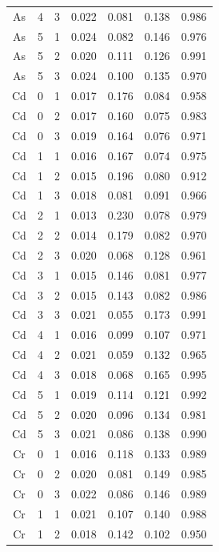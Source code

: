 \documentclass[ms, hidelinks]{uncgdissertationexp3}
\theoremstyle{plain}
\theoremstyle{definition}
\theoremstyle{remark}
\begin{document}
\begin{longtable}{ccccccc}
  \rowcolor{gray!6}  As & 4 & 3 & 0.022 & 0.081 & 0.138 & 0.986\\
  As & 5 & 1 & 0.024 & 0.082 & 0.146 & 0.976\\
  \rowcolor{gray!6}  As & 5 & 2 & 0.020 & 0.111 & 0.126 & 0.991\\
  As & 5 & 3 & 0.024 & 0.100 & 0.135 & 0.970\\
  \rowcolor{gray!6}  Cd & 0 & 1 & 0.017 & 0.176 & 0.084 & 0.958\\
  Cd & 0 & 2 & 0.017 & 0.160 & 0.075 & 0.983\\
  \rowcolor{gray!6}  Cd & 0 & 3 & 0.019 & 0.164 & 0.076 & 0.971\\
  Cd & 1 & 1 & 0.016 & 0.167 & 0.074 & 0.975\\
  \rowcolor{gray!6}  Cd & 1 & 2 & 0.015 & 0.196 & 0.080 & 0.912\\
  Cd & 1 & 3 & 0.018 & 0.081 & 0.091 & 0.966\\
  \rowcolor{gray!6}  Cd & 2 & 1 & 0.013 & 0.230 & 0.078 & 0.979\\
  Cd & 2 & 2 & 0.014 & 0.179 & 0.082 & 0.970\\
  \rowcolor{gray!6}  Cd & 2 & 3 & 0.020 & 0.068 & 0.128 & 0.961\\
  Cd & 3 & 1 & 0.015 & 0.146 & 0.081 & 0.977\\
  \rowcolor{gray!6}  Cd & 3 & 2 & 0.015 & 0.143 & 0.082 & 0.986\\
  Cd & 3 & 3 & 0.021 & 0.055 & 0.173 & 0.991\\
  \rowcolor{gray!6}  Cd & 4 & 1 & 0.016 & 0.099 & 0.107 & 0.971\\
  Cd & 4 & 2 & 0.021 & 0.059 & 0.132 & 0.965\\
  \rowcolor{gray!6}  Cd & 4 & 3 & 0.018 & 0.068 & 0.165 & 0.995\\
  Cd & 5 & 1 & 0.019 & 0.114 & 0.121 & 0.992\\
  \rowcolor{gray!6}  Cd & 5 & 2 & 0.020 & 0.096 & 0.134 & 0.981\\
  Cd & 5 & 3 & 0.021 & 0.086 & 0.138 & 0.990\\
  \rowcolor{gray!6}  Cr & 0 & 1 & 0.016 & 0.118 & 0.133 & 0.989\\
  Cr & 0 & 2 & 0.020 & 0.081 & 0.149 & 0.985\\
  \rowcolor{gray!6}  Cr & 0 & 3 & 0.022 & 0.086 & 0.146 & 0.989\\
  Cr & 1 & 1 & 0.021 & 0.107 & 0.140 & 0.988\\
  \rowcolor{gray!6}  Cr & 1 & 2 & 0.018 & 0.142 & 0.102 & 0.950\\

\end{longtable}
\end{document}
